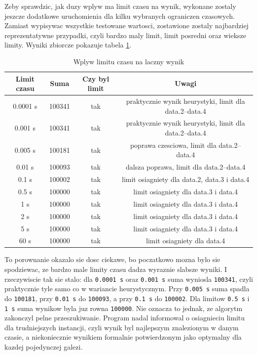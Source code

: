 \documentclass[12pt,a4paper]{article}
\begin{document}
Zeby sprawdzic, jak duzy wplyw ma limit czasu na wynik, wykonane zostaly jeszcze dodatkowe uruchomienia dla kilku wybranych ograniczen czasowych. Zamiast wypisywac wszystkie testowane wartosci, zostawione zostaly najbardziej reprezentatywne przypadki, czyli bardzo maly limit, limit posredni oraz wieksze limity. Wyniki zbiorcze pokazuje tabela \ref{tab:limity}.

\begin{table}[h]
\centering
\begin{tabular}{cccc}
\toprule
Limit czasu & Suma & Czy byl limit & Uwagi \\
\midrule
0.0001 s & 100341 & tak & praktycznie wynik heurystyki, limit dla data.2--data.4 \\
0.001 s & 100341 & tak & praktycznie wynik heurystyki, limit dla data.2--data.4 \\
0.005 s & 100181 & tak & poprawa czesciowa, limit dla data.2--data.4 \\
0.01 s & 100093 & tak & dalsza poprawa, limit dla data.2--data.4 \\
0.1 s & 100002 & tak & limit osiagniety dla data.2, data.3 i data.4 \\
0.5 s & 100000 & tak & limit osiagniety dla data.3 i data.4 \\
1 s & 100000 & tak & limit osiagniety dla data.3 i data.4 \\
2 s & 100000 & tak & limit osiagniety dla data.3 i data.4 \\
5 s & 100000 & tak & limit osiagniety dla data.3 i data.4 \\
60 s & 100000 & tak & limit osiagniety dla data.4 \\
\bottomrule
\end{tabular}
\caption{Wplyw limitu czasu na laczny wynik}
\label{tab:limity}
\end{table}

To porownanie okazalo sie dosc ciekawe, bo poczatkowo mozna bylo sie spodziewac, ze bardzo male limity czasu dadza wyraznie slabsze wyniki. I rzeczywiscie tak sie stalo: dla \texttt{0.0001 s} oraz \texttt{0.001 s} suma wyniosla \texttt{100341}, czyli praktycznie tyle samo co w wariancie heurystycznym. Przy \texttt{0.005 s} suma spadla do \texttt{100181}, przy \texttt{0.01 s} do \texttt{100093}, a przy \texttt{0.1 s} do \texttt{100002}. Dla limitow \texttt{0.5 s} i \texttt{1 s} suma wynikow byla juz rowna \texttt{100000}. Nie oznacza to jednak, ze algorytm zakonczyl pelne przeszukiwanie. Program nadal informowal o osiagnieciu limitu dla trudniejszych instancji, czyli wynik byl najlepszym znalezionym w danym czasie, a niekoniecznie wynikiem formalnie potwierdzonym jako optymalny dla kazdej pojedynczej galezi.
\end{document}
